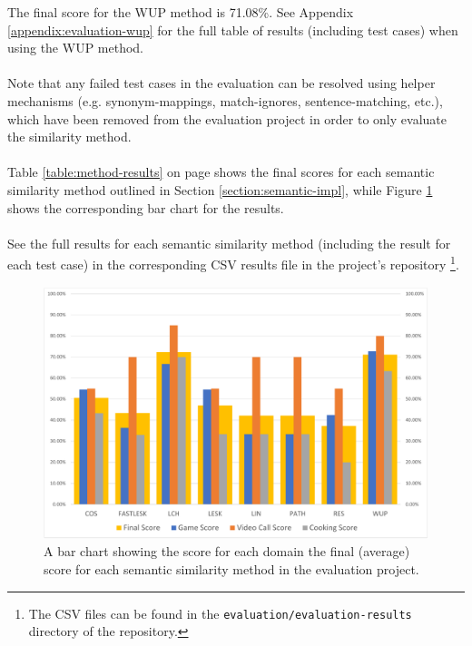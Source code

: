 \documentclass[11pt]{article}
\begin{document}
The final score for the WUP method is 71.08\%. See Appendix \ref{appendix:evaluation-wup} for the full table of results (including test cases) when using the WUP method.
\\
\\
Note that any failed test cases in the evaluation can be resolved using helper mechanisms (e.g. synonym-mappings, match-ignores, sentence-matching, etc.), which have been removed from the evaluation project in order to only evaluate the similarity method.
\\
\\
Table \ref{table:method-results} on page \pageref{table:method-results} shows the final scores for each semantic similarity method outlined in Section \ref{section:semantic-impl}, while Figure \ref{fig:evaluation-results-bar-chart} shows the corresponding bar chart for the results.
\\
\\
See the full results for each semantic similarity method (including the result for each test case) in the corresponding CSV results file in the project's repository \footnote{The CSV files can be found in the \texttt{evaluation/evaluation-results} directory of the repository.}.
\\
\begin{figure}
\begin{center}
  \includegraphics[width=\textwidth]{evaluation-results-bar-chart.pdf}
  \caption{A bar chart showing the score for each domain the final (average) score for each semantic similarity method in the evaluation project.}
  \label{fig:evaluation-results-bar-chart}
  \end{center}
\end{figure}
\end{document}
